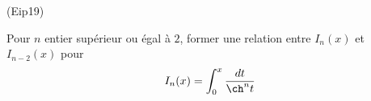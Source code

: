 \begin{tiny}(Eip19)\end{tiny}
Pour $n$ entier supérieur ou égal à $2$, former une relation entre $I_n(x)$ et $I_{n-2}(x)$ pour
\begin{displaymath}
 I_n(x) = \int_0^x\frac{dt}{\ch^n t}
\end{displaymath}
